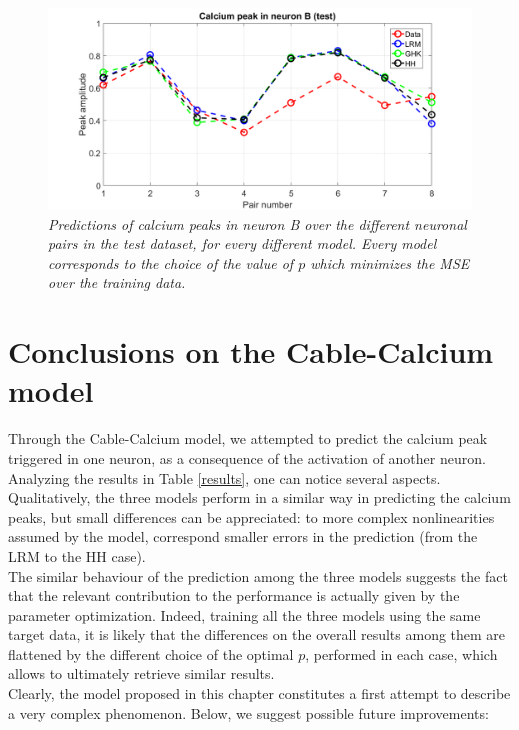 \documentclass[12pt, a4paper]{report}
\begin{document}
	


\begin{figure}[H]
	\begin{center}
		\hspace*{-1.5 cm}
		\includegraphics[scale=0.5]{test_model.png} 
	\end{center} 
	\caption{\textit{Predictions of calcium peaks in neuron B over the different neuronal pairs in the test dataset, for every different model. Every model corresponds to the choice of the value of $p$ which minimizes the MSE over the training data.}}
	\label{test}
\end{figure}

\section{Conclusions on the Cable-Calcium model} \label{section cablec conclusions}

Through the Cable-Calcium model, we attempted to predict the calcium peak triggered in one neuron, as a consequence of the activation of another neuron. Analyzing the results in Table \ref{results}, one can notice several aspects.\\
Qualitatively, the three models perform in a similar way in predicting the calcium peaks, but small differences can be appreciated: to more complex nonlinearities assumed by the model, correspond smaller errors in the prediction (from the LRM to the HH case).\\
The similar behaviour of the prediction among the three models suggests the fact that the relevant contribution to the performance is actually given by the parameter optimization. Indeed, training all the three models using the same target data, it is likely that the differences on the overall results among them are flattened by the different choice of the optimal $p$, performed in each case, which allows to ultimately retrieve  similar results.\\
Clearly, the model proposed in this chapter constitutes a first attempt to describe a very complex phenomenon. Below, we suggest possible future improvements:
\end{document}
